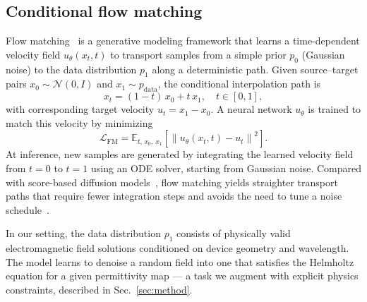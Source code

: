 \subsection{Conditional flow matching}

Flow matching~\cite{Lipman2022FlowMatching,Liu2023RectifiedFlow} is a generative modeling framework that learns a
time-dependent velocity field $u_\theta(x_t,t)$ to transport samples from a simple prior $p_0$ (Gaussian noise) to the
data distribution $p_1$ along a deterministic path. Given source--target pairs $x_0\sim\mathcal{N}(0,I)$ and
$x_1\sim p_\text{data}$, the conditional interpolation path is
\begin{equation}
    x_t = (1-t)\,x_0 + t\,x_1, \quad t\in[0,1],
    \label{eq:interpolation}
\end{equation}
with corresponding target velocity $u_t = x_1 - x_0$. A neural network $u_\theta$ is trained to match this velocity
by minimizing
\begin{equation}
    \mathcal{L}_\text{FM} = \mathbb{E}_{t,\,x_0,\,x_1}\!\left[\left\|u_\theta(x_t,t) - u_t\right\|^2\right].
    \label{eq:fm_loss}
\end{equation}
At inference, new samples are generated by integrating the learned velocity field from $t{=}0$ to $t{=}1$ using an ODE
solver, starting from Gaussian noise. Compared with score-based diffusion models~\cite{Song2021ScoreSDE}, flow matching yields straighter transport paths
that require fewer integration steps and avoids the need to tune a noise
schedule~\cite{Lipman2022FlowMatching,Liu2023RectifiedFlow}.

In our setting, the data distribution $p_1$ consists of physically valid electromagnetic field solutions conditioned on
device geometry and wavelength.  The model learns to denoise a random field into one that satisfies the Helmholtz
equation for a given permittivity map --- a task we augment with explicit physics constraints, described in
Sec.~\ref{sec:method}.
